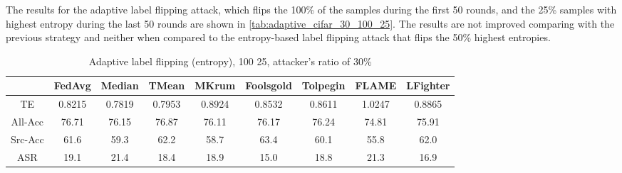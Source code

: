 The results for the adaptive label flipping attack, which flips the 100\% of the samples during the first 50 rounds, and the 25\% samples with highest entropy during the last 50 rounds are shown in \autoref{tab:adaptive_cifar_30_100_25}. The results are not improved comparing with the previous strategy and neither when compared to the entropy-based label flipping attack that flips the 50\% highest entropies.

\begin{table}[h!]
        \centering
        \small
        \begin{adjustbox}{center}
        \begin{tabular}{|c|c|c|c|c|c|c|c|c|}
            \hline
            & FedAvg & Median & TMean & MKrum & Foolsgold & Tolpegin & FLAME & LFighter \\
            \hline
            TE & 0.8215 & 0.7819 & 0.7953 & 0.8924 & 0.8532 & 0.8611 & 1.0247 & 0.8865 \\
            \hline
            All-Acc & 76.71 & 76.15 & 76.87 & 76.11 & 76.17 & 76.24 & 74.81 & 75.91 \\
            \hline
            Src-Acc & 61.6 & 59.3 & 62.2 & 58.7 & 63.4 & 60.1 & 55.8 & 62.0 \\
            \hline
            ASR & 19.1 & 21.4 & 18.4 & 18.9 & 15.0 & 18.8 & 21.3 & 16.9 \\
            \hline
        \end{tabular}
        \end{adjustbox}
        \caption{Adaptive label flipping (entropy), 100 25, attacker's ratio of 30\%}
        \label{tab:adaptive_cifar_30_100_25}
    \end{table}
    
